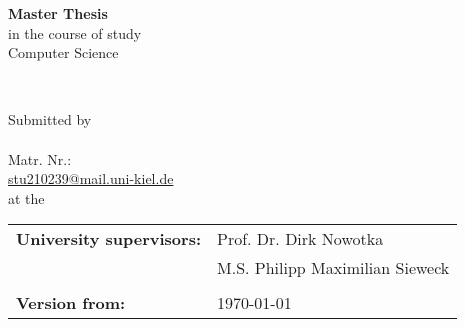 
\begin{titlepage}

    
    
    
    
    \center
    \LARGE
    \vspace*{0.5cm}
    \textbf{Master Thesis}\\[0.5cm]
    \large
    in the course of study\\
    
    Computer Science\\
    \vfill
    
    
    
    \begin{spacing}{2}
        {\huge \bfseries \textbf{\myThesis{}}}\\
    \end{spacing}
    \vfill
    
    
    
    
    Submitted by\\[0.5cm]
    
    \textbf{\myName{}}\\
    Matr. Nr.: \myStudentID{} \\
    \href{mailto:stu210239@mail.uni-kiel.de}{stu210239@mail.uni-kiel.de}\\[0.5cm]
    
    at the \myHochschule{} \\
    
    \vfill
    
    \begin{tabular}{ll}
        \textbf{University supervisors:} & Prof. Dr. Dirk Nowotka          \\
                                         & M.S. Philipp Maximilian Sieweck \\
                                         &                                 \\
        \textbf{Version from: }          & \today                          \\
    \end{tabular}
    
    \vfill
    
\end{titlepage}